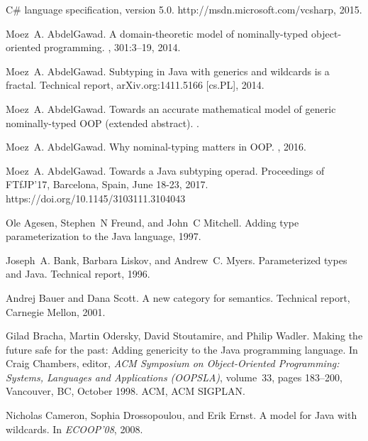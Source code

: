 \documentclass[twocolumn,english]{article}
\numberwithin{equation}{section}
\numberwithin{figure}{section}
\begin{document}

\begin{thebibliography}{10}
	
	C\# language specification, version 5.0.
	\newblock http://msdn.microsoft.com/vcsharp, 2015.
	
	Moez~A. AbdelGawad.
	\newblock A domain-theoretic model of nominally-typed object-oriented
	programming.
	, 301:3--19, 2014.
	
	Moez~A. AbdelGawad.
	\newblock Subtyping in {J}ava with generics and wildcards is a fractal.
	\newblock Technical report, {arXiv.org:1411.5166 [cs.PL]}, 2014.
	
	Moez~A. AbdelGawad.
	\newblock Towards an accurate mathematical model of generic nominally-typed
	{OOP} (extended abstract).
	.
	
	Moez~A. AbdelGawad.
	\newblock Why nominal-typing matters in {OOP}.
	, 2016.
	
	Moez~A. AbdelGawad.
	\newblock Towards a {J}ava subtyping operad.
	\newblock Proceedings of FTfJP'17, Barcelona, Spain, June 18-23, 2017.
	\newblock https://doi.org/10.1145/3103111.3104043
	
	Ole Agesen, Stephen~N Freund, and John~C Mitchell.
	\newblock Adding type parameterization to the {J}ava language, 1997.
	
	Joseph~A. Bank, Barbara Liskov, and Andrew~C. Myers.
	\newblock Parameterized types and {J}ava.
	\newblock Technical report, 1996.
	
	Andrej Bauer and Dana Scott.
	\newblock A new category for semantics.
	\newblock Technical report, Carnegie Mellon, 2001.
	
	Gilad Bracha, Martin Odersky, David Stoutamire, and Philip Wadler.
	\newblock Making the future safe for the past: Adding genericity to the {J}ava
	programming language.
	\newblock In Craig Chambers, editor, {\em ACM Symposium on Object-Oriented
		Programming: Systems, Languages and Applications (OOPSLA)}, volume~33, pages
	183--200, Vancouver, BC, October 1998. ACM, ACM SIGPLAN.
	
	Nicholas Cameron, Sophia Drossopoulou, and Erik Ernst.
	\newblock A model for {J}ava with wildcards.
	\newblock In {\em ECOOP'08}, 2008.
	

\end{thebibliography}
\end{document}
